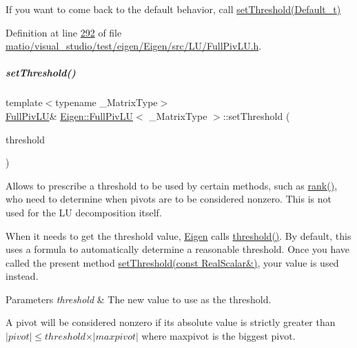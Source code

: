 If you want to come back to the default behavior, call \hyperlink{group___l_u___module_a1b5e30add3dfb6625da1213d68418f44}{set\+Threshold(\+Default\+\_\+t)} 

Definition at line \hyperlink{matio_2visual__studio_2test_2eigen_2_eigen_2src_2_l_u_2_full_piv_l_u_8h_source_l00292}{292} of file \hyperlink{matio_2visual__studio_2test_2eigen_2_eigen_2src_2_l_u_2_full_piv_l_u_8h_source}{matio/visual\+\_\+studio/test/eigen/\+Eigen/src/\+L\+U/\+Full\+Piv\+L\+U.\+h}.

\mbox{\label{group___l_u___module_a414592d82de98f5bd075965caf56d681}} 
\subparagraph{\texorpdfstring{set\+Threshold()}{setThreshold()}\hspace{0.1cm}{\footnotesize\ttfamily [2/4]}}
{\footnotesize\ttfamily template$<$typename \+\_\+\+Matrix\+Type$>$ \\
\hyperlink{group___l_u___module_class_eigen_1_1_full_piv_l_u}{Full\+Piv\+LU}\& \hyperlink{group___l_u___module_class_eigen_1_1_full_piv_l_u}{Eigen\+::\+Full\+Piv\+LU}$<$ \+\_\+\+Matrix\+Type $>$\+::set\+Threshold (\begin{DoxyParamCaption}\item[{const Real\+Scalar \&}]{threshold }\end{DoxyParamCaption})\hspace{0.3cm}{\ttfamily [inline]}}

Allows to prescribe a threshold to be used by certain methods, such as \hyperlink{group___l_u___module_a67a870aa69e699e058d04802ba0bdad9}{rank()}, who need to determine when pivots are to be considered nonzero. This is not used for the LU decomposition itself.

When it needs to get the threshold value, \hyperlink{namespace_eigen}{Eigen} calls \hyperlink{group___l_u___module_ad77539203694f2d85ff7d11616e5a0a5}{threshold()}. By default, this uses a formula to automatically determine a reasonable threshold. Once you have called the present method \hyperlink{group___l_u___module_a414592d82de98f5bd075965caf56d681}{set\+Threshold(const Real\+Scalar\&)}, your value is used instead.


\begin{DoxyParams}{Parameters}
{\em threshold} & The new value to use as the threshold.\\
\hline
\end{DoxyParams}
A pivot will be considered nonzero if its absolute value is strictly greater than $ \vert pivot \vert \leqslant threshold \times \vert maxpivot \vert $ where maxpivot is the biggest pivot.

